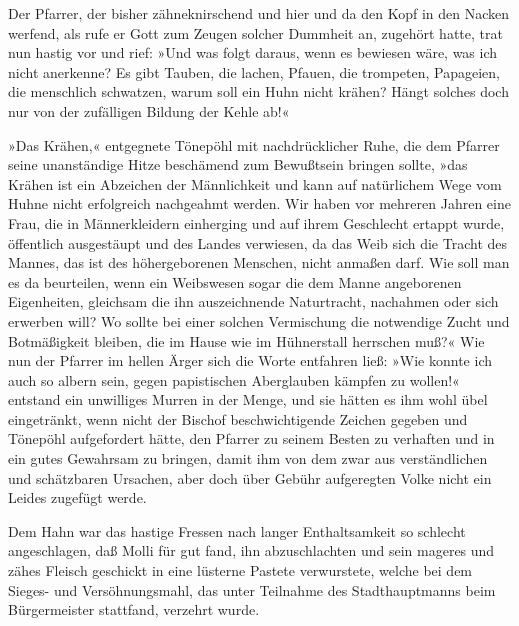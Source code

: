 Der Pfarrer, der bisher zähneknirschend und hier und da den Kopf in
den Nacken werfend, als rufe er Gott zum Zeugen solcher Dummheit
an, zugehört hatte, trat nun hastig vor und rief: »Und was folgt
daraus, wenn es bewiesen wäre, was ich nicht anerkenne? Es gibt
Tauben, die lachen, Pfauen, die trompeten, Papageien, die
menschlich schwatzen, warum soll ein Huhn nicht krähen? Hängt
solches doch nur von der zufälligen Bildung der Kehle ab!«

»Das Krähen,« entgegnete Tönepöhl mit nachdrücklicher Ruhe, die dem
Pfarrer seine unanständige Hitze beschämend zum Bewußtsein bringen
sollte, »das Krähen ist ein Abzeichen der Männlichkeit und kann auf
natürlichem Wege vom Huhne nicht erfolgreich nachgeahmt werden. Wir
haben vor mehreren Jahren eine Frau, die in Männerkleidern
einherging und auf ihrem Geschlecht ertappt wurde, öffentlich
ausgestäupt und des Landes verwiesen, da das Weib sich die Tracht
des Mannes, das ist des höhergeborenen Menschen, nicht anmaßen
darf. Wie soll man es da beurteilen, wenn ein Weibswesen sogar die
dem Manne angeborenen Eigenheiten, gleichsam die ihn auszeichnende
\pagenum{[51]}Naturtracht, nachahmen oder sich erwerben will? Wo
sollte bei einer solchen Vermischung die notwendige Zucht und
Botmäßigkeit bleiben, die im Hause wie im Hühnerstall herrschen
muß?« Wie nun der Pfarrer im hellen Ärger sich die Worte entfahren
ließ: »Wie konnte ich auch so albern sein, gegen papistischen
Aberglauben kämpfen zu wollen!« entstand ein unwilliges Murren in
der Menge, und sie hätten es ihm wohl übel eingetränkt, wenn nicht
der Bischof beschwichtigende Zeichen gegeben und Tönepöhl
aufgefordert hätte, den Pfarrer zu seinem Besten zu verhaften und
in ein gutes Gewahrsam zu bringen, damit ihm von dem zwar aus
verständlichen und schätzbaren Ursachen, aber doch über Gebühr
aufgeregten Volke nicht ein Leides zugefügt werde.

Dem Hahn war das hastige Fressen nach langer Enthaltsamkeit so
schlecht angeschlagen, daß Molli für gut fand, ihn abzuschlachten
und sein mageres und zähes Fleisch geschickt in eine lüsterne
Pastete verwurstete, welche bei dem Sieges- und Versöhnungsmahl,
das unter Teilnahme des Stadthauptmanns beim Bürgermeister
stattfand, verzehrt wurde.


